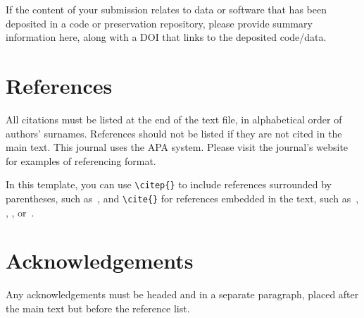 \documentclass{article}
\begin{document}
If the content of your submission relates to data or software
that has been deposited in a code or preservation repository,
please provide summary information here, along with a DOI that
links to the deposited code/data.



\section{References}

All citations must be listed at the end of the text file,
in alphabetical order of authors' surnames.
References should not be listed if they are not cited in
the main text.
This journal uses the APA system.
Please visit the journal's website
for examples of referencing format.

In this template, you can use \verb=\citep{}= to include references
surrounded by parentheses, such as~\citep{KneesS16_MusicSimilarityRetrieval_SPRINGER}, and \verb=\cite{}=
for references embedded in the text,
such as~\cite{WeihsJVR16_MusicDataAnalysis_CRC},
\cite{SerraEtAl13_RoadmapMIR_CreativeCommon},
\cite{Lerch15_AudioContentAnalysis_WILEY},
or~\cite{Mueller15_FMP_SPRINGER}.



\section*{Acknowledgements}

Any acknowledgements must be headed and in a separate paragraph,
placed after the main text but before the reference list.




%
%
%
%
\end{document}
